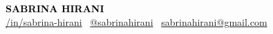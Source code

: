 \documentclass[9pt]{developercv} %
\newcommand{\icon}[3]{\raisebox{-.2\height}{\texttt{[image: \#1]}}#3}
\begin{document}

\begin{center}
\begin{minipage}[t]{0.8\textwidth}
    \centering
    {\fontsize{16}{20} \textcolor{black}{\textbf{\MakeUppercase{Sabrina Hirani}}}}\\[\baselineskip]
    \icon{LinkedinSquare}{11}{\href{https://www.linkedin.com/in/sabrina-hirani/}{/in/sabrina-hirani}} \textbar\ 
    \icon{Github}{11}{\href{https://github.com/sabrinahirani}{@sabrinahirani}} \textbar\ 
    \icon{Envelope}{11}{\href{mailto:sabrinahirani@gmail.com}{sabrinahirani@gmail.com}}
\end{minipage}
\end{center}
\end{document}
